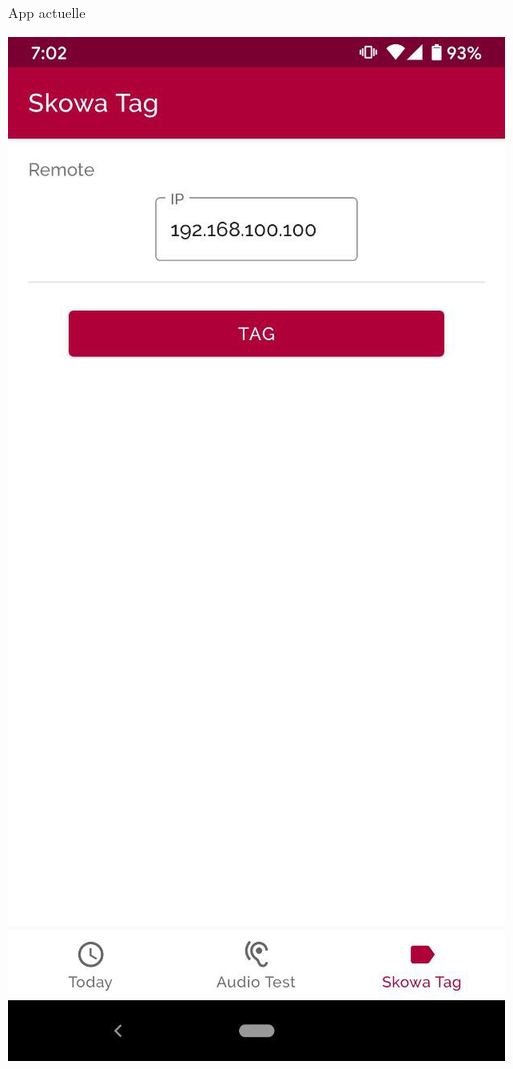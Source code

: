 \documentclass[aspectratio=169]{beamer}
\begin{document}
\begin{frame}{App actuelle}
\begin{minipage}{.3\textwidth}
  \end{minipage}%
  \begin{minipage}{.3\textwidth}
    \centering
    \includegraphics[height=.8\textheight]{../assets/android2}
  \end{minipage}

\end{frame}
\end{document}
